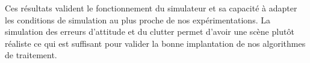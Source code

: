 Ces résultats valident le fonctionnement du simulateur et sa capacité à adapter les conditions de simulation au plus proche de nos expérimentations. La simulation des erreurs d'attitude et du clutter permet d'avoir une scène plutôt réaliste ce qui est suffisant pour valider la bonne implantation de nos algorithmes de traitement.



